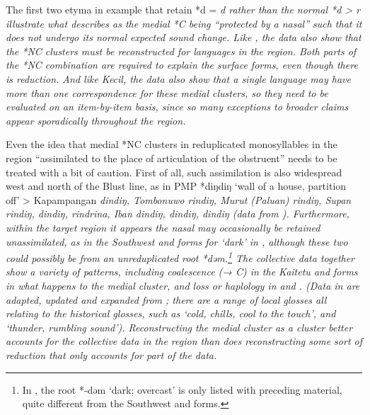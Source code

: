 The first two etyma in example  that retain *d = \it{d}
rather than the normal *d > \it{r} illustrate what \citet[293f]{Wolff2010}
describes as the medial *C being “protected by a nasal” such
that it does not undergo its normal expected sound change.
Like , the  data also show that the *NC clusters must
be reconstructed for languages in the region.
Both parts of the *NC combination are required to explain the
surface forms, even though there is reduction.
And like  Kecil,
the  data also show that a single language may have more
than one correspondence for these medial clusters,
so they need to be evaluated on an item-by-item basis,
since so many exceptions to broader claims appear sporadically
throughout the region.

Even the idea that medial *NC clusters in reduplicated monosyllables
in the region “assimilated to the place of articulation of the
obstruent” \citep[246]{Blust1993} needs to be treated with a bit of caution.
First of all, such assimilation is also widespread west
and north of the Blust line,
as in PMP *diŋdiŋ ‘wall of a house,
partition off’ > Kapampangan \it{dindiŋ},
Tombonuwo \it{rindiŋ}, Murut (Paluan) \it{rindiŋ}, Supan \it{rindiŋ},
 \it{dindiŋ},  \it{rindrina},
Iban \it{dindiŋ},  \it{dindiŋ},
 \it{dindiŋ} (data from \citealp{BlustTrussel2020}).
Furthermore, within the target region it appears the nasal may
occasionally be retained unassimilated,
as in the Southwest 
and  forms for ‘dark’ in ,
although these two could possibly be from an unreduplicated root
*dəm.\footnote{
		In \citet{BlustTrussel2020}, the root *-dəm
		‘dark; overcast’ is only listed with preceding
		material, quite different from the Southwest 
		and  forms.}
The collective data together show a variety
of patterns, including coalescence (→ C) in the Kaitetu
and  forms in what happens to the medial cluster,
and loss or haplology in  and .
(Data in  are adapted,
updated and expanded from \citet{Grimes1991a}; there are a range of
local glosses all relating to the historical glosses,
such as ‘cold, chills,
cool to the touch’,
and ‘thunder, rumbling sound’).
Reconstructing the medial cluster as a cluster better accounts
for the collective data in the region than does reconstructing
some sort of reduction that only accounts for part of the data.


